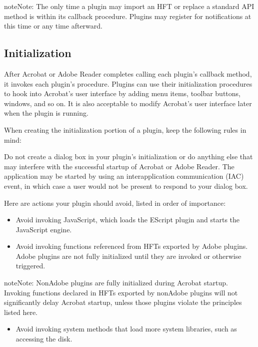 \documentclass[letterpaper,12pt,english,openany,oneside]{sphinxmanual}
\begin{document}
\begin{sphinxadmonition}{note}{Note:}
The only time a plugin may import an HFT or replace a standard API method is within its  callback procedure. Plugins may register for notifications at this time or any time afterward.
\end{sphinxadmonition}


\subsection{Initialization}
\label{\detokenize{Plugins_Pimech:initialization}}
After Acrobat or Adobe Reader completes calling each plugin’s  callback method, it invokes each plugin’s  procedure. Plugins can use their initialization procedures to hook into Acrobat’s user interface by adding menu items, toolbar buttons, windows, and so on. It is also acceptable to modify Acrobat’s user interface later when the plugin is running.

When creating the initialization portion of a plugin, keep the following rules in mind:

 Do not create a dialog box in your plugin’s initialization or do anything else that may interfere with the successful startup of Acrobat or Adobe Reader. The application may be started by using an interapplication communication (IAC) event, in which case a user would not be present to respond to your dialog box.

 Here are actions your plugin should avoid, listed in order of importance:
\begin{itemize}
\item {} 
Avoid invoking JavaScript, which loads the EScript plugin and starts the JavaScript engine.

\item {} 
Avoid invoking functions referenced from HFTs exported by Adobe plugins. Adobe plugins are not fully initialized until they are invoked or otherwise triggered.

\end{itemize}

\begin{sphinxadmonition}{note}{Note:}
Non\sphinxhyphen{}Adobe plugins are fully initialized during Acrobat startup. Invoking functions declared in HFTs exported by non\sphinxhyphen{}Adobe plugins will not significantly delay Acrobat startup, unless those plugins violate the principles listed here.
\end{sphinxadmonition}
\begin{itemize}
\item {} 
Avoid invoking system methods that load more system libraries, such as accessing the disk.

\end{itemize}
\end{document}
